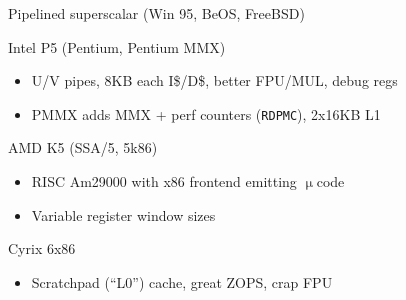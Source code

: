 \documentclass[mathserif,xcolor={dvipsnames,table}]{beamer}
\begin{document}
\begin{frame}[t]{Pipelined superscalar (Win 95, BeOS, FreeBSD)}
\begin{block}{Intel P5 (Pentium, Pentium MMX)}
\begin{itemize}
\item U/V pipes, 8KB each I\$/D\$, better FPU/MUL, debug regs
\item PMMX adds MMX + perf counters (\texttt{RDPMC}), 2x16KB L1
\end{itemize}
\end{block}
\begin{block}{AMD K5 (SSA/5, 5k86)}
\begin{itemize}
\item RISC Am29000 with x86 frontend emitting $\upmu$code
\item Variable register window sizes
\end{itemize}
\end{block}
\begin{block}{Cyrix 6x86}
\begin{itemize}
\item Scratchpad (``L0'') cache, great ZOPS, crap FPU
\end{itemize}
\end{block}
\vfill
\begin{center}
\end{center}
\end{frame}
\end{document}
